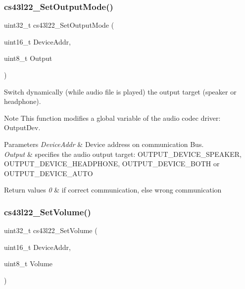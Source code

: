 \subsubsection{\texorpdfstring{cs43l22\+\_\+\+Set\+Output\+Mode()}{cs43l22\_SetOutputMode()}}
{\footnotesize\ttfamily uint32\+\_\+t cs43l22\+\_\+\+Set\+Output\+Mode (\begin{DoxyParamCaption}\item[{uint16\+\_\+t}]{Device\+Addr,  }\item[{uint8\+\_\+t}]{Output }\end{DoxyParamCaption})}



Switch dynamically (while audio file is played) the output target (speaker or headphone). 

\begin{DoxyNote}{Note}
This function modifies a global variable of the audio codec driver\+: Output\+Dev. 
\end{DoxyNote}

\begin{DoxyParams}{Parameters}
{\em Device\+Addr} & Device address on communication Bus. \\
\hline
{\em Output} & specifies the audio output target\+: O\+U\+T\+P\+U\+T\+\_\+\+D\+E\+V\+I\+C\+E\+\_\+\+S\+P\+E\+A\+K\+ER, O\+U\+T\+P\+U\+T\+\_\+\+D\+E\+V\+I\+C\+E\+\_\+\+H\+E\+A\+D\+P\+H\+O\+NE, O\+U\+T\+P\+U\+T\+\_\+\+D\+E\+V\+I\+C\+E\+\_\+\+B\+O\+TH or O\+U\+T\+P\+U\+T\+\_\+\+D\+E\+V\+I\+C\+E\+\_\+\+A\+U\+TO \\
\hline
\end{DoxyParams}

\begin{DoxyRetVals}{Return values}
{\em 0} & if correct communication, else wrong communication \\
\hline
\end{DoxyRetVals}
\mbox{\label{group___c_s43_l22___exported___functions_ga9cd060bb226e44065ec50c7803041114}} 
\subsubsection{\texorpdfstring{cs43l22\+\_\+\+Set\+Volume()}{cs43l22\_SetVolume()}}
{\footnotesize\ttfamily uint32\+\_\+t cs43l22\+\_\+\+Set\+Volume (\begin{DoxyParamCaption}\item[{uint16\+\_\+t}]{Device\+Addr,  }\item[{uint8\+\_\+t}]{Volume }\end{DoxyParamCaption})}



